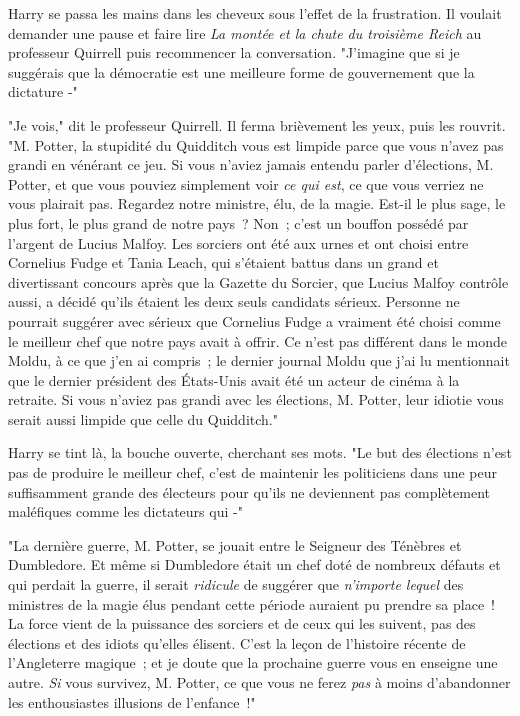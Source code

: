 Harry se passa les mains dans les cheveux sous l'effet de la frustration. Il voulait demander une pause et faire lire \emph{La montée et la chute du troisième Reich} au professeur Quirrell puis recommencer la conversation. "J'imagine que si je suggérais que la démocratie est une meilleure forme de gouvernement que la dictature -"

"Je vois," dit le professeur Quirrell. Il ferma brièvement les yeux, puis les rouvrit. "M. Potter, la stupidité du Quidditch vous est limpide parce que vous n'avez pas grandi en vénérant ce jeu. Si vous n'aviez jamais entendu parler d'élections, M. Potter, et que vous pouviez simplement voir \emph{ce qui est}, ce que vous verriez ne vous plairait pas. Regardez notre ministre, élu, de la magie. Est-il le plus sage, le plus fort, le plus grand de notre pays~? Non~; c'est un bouffon possédé par l'argent de Lucius Malfoy. Les sorciers ont été aux urnes et ont choisi entre Cornelius Fudge et Tania Leach, qui s'étaient battus dans un grand et divertissant concours après que la Gazette du Sorcier, que Lucius Malfoy contrôle aussi, a décidé qu'ils étaient les deux seuls candidats sérieux. Personne ne pourrait suggérer avec sérieux que Cornelius Fudge a vraiment été choisi comme le meilleur chef que notre pays avait à offrir. Ce n'est pas différent dans le monde Moldu, à ce que j'en ai compris~; le dernier journal Moldu que j'ai lu mentionnait que le dernier président des États-Unis avait été un acteur de cinéma à la retraite. Si vous n'aviez pas grandi avec les élections, M. Potter, leur idiotie vous serait aussi limpide que celle du Quidditch."

Harry se tint là, la bouche ouverte, cherchant ses mots. "Le but des élections n'est pas de produire le meilleur chef, c'est de maintenir les politiciens dans une peur suffisamment grande des électeurs pour qu'ils ne deviennent pas complètement maléfiques comme les dictateurs qui -"

"La dernière guerre, M. Potter, se jouait entre le Seigneur des Ténèbres et Dumbledore. Et même si Dumbledore était un chef doté de nombreux défauts et qui perdait la guerre, il serait \emph{ridicule} de suggérer que \emph{n'importe lequel} des ministres de la magie élus pendant cette période auraient pu prendre sa place~! La force vient de la puissance des sorciers et de ceux qui les suivent, pas des élections et des idiots qu'elles élisent. C'est la leçon de l'histoire récente de l'Angleterre magique~; et je doute que la prochaine guerre vous en enseigne une autre. \emph{Si} vous survivez, M. Potter, ce que vous ne ferez \emph{pas} à moins d'abandonner les enthousiastes illusions de l'enfance~!"

